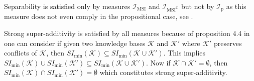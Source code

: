 Separability is satisfied only by measures \(\mathcal{I}_{\text{MSI}}\) and \(\mathcal{I}_{\text{MSI}^\text{C}}\) but not by \(\mathcal{I}_{\text{p}}\) as this measure does not even comply in the propositional case, see \cite{thimm_compliance_2017}.

Strong super-additivity is satisfied by all measures because of proposition 4.4 in \cite{ulbricht_handling_2020} one can consider if given two knowledge bases \(\mathcal{K}\) and \(\mathcal{K}'\) where \(\mathcal{K}'\) preserves conflicts of \(\mathcal{K}\), then \(SI_{\min}(\mathcal{K}) \subseteq SI_{\min}(\mathcal{K} \cup \mathcal{K}')\). This implies \(SI_{\min}(\mathcal{K}) \cup SI_{\min}(\mathcal{K}') \subseteq SI_{\min}(\mathcal{K} \cup \mathcal{K}')\). Now if \(\mathcal{K} \cap \mathcal{K}' = \emptyset\), then \(SI_{\min}(\mathcal{K}) \cap SI_{\min}(\mathcal{K}') = \emptyset\) which constitutes strong super-additivity.
